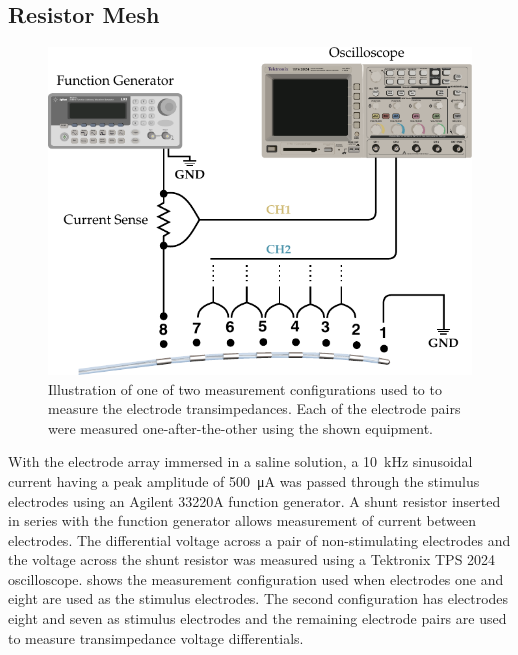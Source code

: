     \subsection{Resistor Mesh}

      \begin{figure}
        \centering
        \includegraphics{content/pt2/08-InterfaceParameters/graphics/measurement_resistorMesh}
        \caption{\label{fig:pt2-measurement_resistorMesh}Illustration of one of two measurement configurations used to to measure the electrode transimpedances. Each of the electrode pairs were measured one-after-the-other using the shown equipment.}
      \end{figure}

      With the electrode array immersed in a saline solution, a \SI{10}{\kilo\hertz} sinusoidal current having a peak amplitude of \SI{500}{\micro\ampere} was passed through the stimulus electrodes using an Agilent 33220A function generator.
      A shunt resistor inserted in series with the function generator allows measurement of current between electrodes.
      The differential voltage across a pair of non-stimulating electrodes and the voltage across the shunt resistor was measured using a Tektronix TPS 2024 oscilloscope.
       shows the measurement configuration used when electrodes one and eight are used as the stimulus electrodes.
      The second configuration has electrodes eight and seven as stimulus electrodes and the remaining electrode pairs are used to measure transimpedance voltage differentials.

